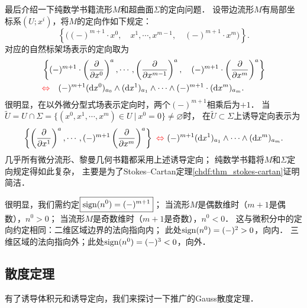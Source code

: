 最后介绍一下纯数学书籍\cite[\S 1.8]{chen-li-2023-2ed-v1}流形$M$和超曲面$\Sigma$的定向问题．
设带边流形$M$有局部坐标系$(U;x^i)$，将$M$的定向作如下规定： 
\begin{equation}
  \left\{\bigl((-)^{m+1}\cdot x^0,\quad x^1,\cdots,x^{m-1},\quad (-)^{m+1}\cdot x^m \bigr)\right\}.
\end{equation}
对应的自然标架场表示的定向取为
\begin{subequations}\label{chsm:eqn_induced-orientation-nt}
\begin{align}
    &\left\{ (-)^{m+1}\cdot \left(\frac{\partial }{\partial x^0}\right)^a, \cdots,
    \left(\frac{\partial }{\partial x^{m-1}}\right)^a, \quad 
     (-)^{m+1}\cdot \left(\frac{\partial }{\partial x^m}\right)^a \right\} \\
    &{\color{red}\Leftrightarrow\quad } 
    (-)^{m+1} ( {\rm d}x^0)_{a_0} \wedge ({\rm d}x^1)_{a_1} \wedge \cdots\wedge (-)^{m+1}\cdot({\rm d}x^m)_{a_m}.
\end{align}
\end{subequations}
很明显，在以外微分型式场表示定向时，两个$(-)^{m+1}$相乘后为$+1$．
当$\widetilde{U}=U\cap \Sigma =\{(x^0,x^1,\cdots,x^m)\in U \ | \ x^0=0 \}\neq \varnothing $时，
在$\widetilde{U}\subset \Sigma$上{\heiti 诱导定向}表示为
\setlength{\mathindent}{0em}
\begin{equation}\label{chsm:eqn_induced-orientation-nc}
    \left\{
    \left(\frac{\partial }{\partial x^1}\right)^a,\cdots,
    (-)^{m+1} \left(\frac{\partial }{\partial x^{m}}\right)^a\right\}
    {\ \color{red}\Leftrightarrow \   } 
    (-)^{m+1} ({\rm d}x^1)_{a_1} \wedge \cdots\wedge({\rm d}x^{m})_{a_{m}}.
\end{equation}\setlength{\mathindent}{2em}
几乎所有微分流形、黎曼几何书籍都采用上述诱导定向；
纯数学书籍将$M$和$\Sigma$定向规定得如此复杂，
主要是为了Stokes--Cartan定理\ref{chdf:thm_stokes-cartan}证明简洁．

很明显，我们需约定$\boxed{{\rm sign}(n^0)=(-)^{m+1}}$；
当流形$M$是偶数维时（$m+1$是偶数），$n^0 > 0$；
当流形$M$是奇数维时（$m+1$是奇数），$n^0 < 0$．
这与微积分中的定向约定相同：二维区域边界的法向指向内；
此处${\rm sign}(n^0)=(-)^{2}>0$，向内．
三维区域的法向指向外；此处${\rm sign}(n^0)=(-)^{3}<0$，向外．



\subsection{散度定理}
有了诱导体积元和诱导定向，我们来探讨一下推广的Gauss散度定理．

